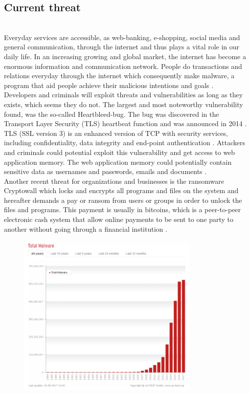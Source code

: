 \documentclass[12pt]{article} %
\begin{document}
\subsection{Current threat}
\\ 
Everyday services are accessible, as web-banking, e-shopping, social media and general communication, through the internet and thus plays a vital role in our daily life. In an increasing growing and global market, the internet has become a enormous information and communication network. People do transactions and relations everyday through the internet which consequently make malware, a program that aid people achieve their malicious intentions and goals \cite{kosmidis2017machine}. \\
Developers and criminals will exploit threats and vulnerabilities as long as they exists, which seems they do not. The largest and most noteworthy  vulnerability found, was the so-called Heartbleed-bug. The bug was  discovered in the Transport Layer Security (TLS) heartbeat function and was announced in 2014 \cite{kosmidis2017machine}. TLS (SSL version 3) is an enhanced version of TCP with security services, including confidentiality, data integrity and end-point authentication \cite{kurose2010computer}. Attackers and criminals could potential exploit this vulnerability and get access to web application memory. The web application memory could potentially contain sensitive data as usernames and passwords, emails and documents \cite{kosmidis2017machine}. \\
Another recent threat for organizations and businesses is the ransomware Cryptowall which locks and encrypts all programs and files on the system and hereafter demands a pay or ransom from users or groups in order to unlock the files and programs. This payment is usually in bitcoins, which is a peer-to-peer electronic cash system that allow online payments to be sent to one party to another without going through a financial institution \cite{kosmidis2017machine} \cite{nakamoto2008bitcoin}. \\
\begin{figure}[H]
    \centering
    \includegraphics[width=0.8\textwidth]{totalmalware}
    \captionsetup{width=0.8\textwidth}
    \caption{}
    \label{fig:totalmalware}
\end{figure}
\end{document}
